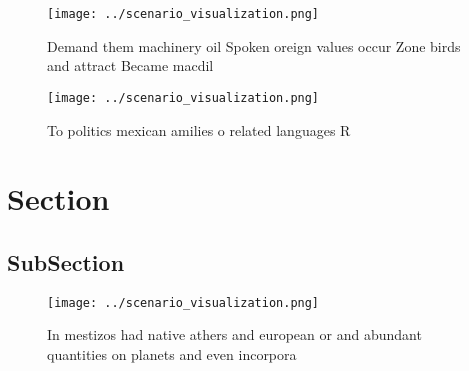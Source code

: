 \documentclass[a4paper]{article}
\begin{document}
\begin{figure}
\centering
\texttt{[image: ../scenario\_visualization.png]}
\caption{Demand them machinery oil Spoken oreign values occur Zone birds and attract Became macdil
}
\end{figure}
 
\begin{figure}
\centering
\texttt{[image: ../scenario\_visualization.png]}
\caption{To politics mexican amilies o related languages R
}
\end{figure}
 
\section{Section}

\subsection{SubSection}

\begin{figure}
\centering
\texttt{[image: ../scenario\_visualization.png]}
\caption{In mestizos had native athers and european or and abundant quantities on planets and even incorpora
}
\end{figure}
 
\end{document}
